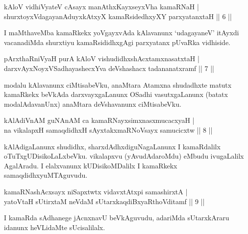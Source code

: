 
\begin{shl}
kAloV vidhiVyateV cAsayx manAthxKayxseyxVha kamaRNaH | \\
shurxtoyxVdagayanAduyxkAtxyX kamaRsidedhxyXY parxyatanxtaH \hfill|| 6 || 
\end{shl}

\begin{artha}
I maMthaveMba kamaRkekx yoVgayxvAda kAlavanunx `udagayaneV' itAyxdi vacanadiMda shurxtiyu kamaRsididhxgAgi parxyatanx pUvaRka vidhiside.
\end{artha}


\begin{shl}
pArxthaRniVyaH purA kAloV vishudidhxshAcx\s \s tamxnasatxtaH | \\
darxvAyxNoyxVSadhayashecxYva deVshashacx tadananatxramf \hfill|| 7 || 
\end{shl}

\begin{artha}
modalu kAlavanunx ciMtisabeVku, anaMtara Atamxna shudadhxte matutx kamaRkekx beVkAda darxvayxgaLanunx OSadhi vasutxgaLanunx (batatx modalAdavanUnx) anaMtara deVshavanunx ciMtisabeVku.
\end{artha}

\begin{shl}
kAlAdiVnAM guNAnAM ca kamaRNayxsimxnasxmucacxyaH | \\
na vikalapxH samaqdidhxH sAyxtakxmaRNoV\s sayx samucicxtw \hfill|| 8 || 
\end{shl}

\begin{artha}
kAlAdigaLanunx shudidhx, sharxdAdhxdiguNagaLanunx I kamaRdalilx oTuTxgUDisikoLaLxbeVku. vikalapxvu (yAvudAdaroMdu) eMbudu ivugaLalilx AgalAradu. I elalxvanunx kUDisikoMDalilx I kamaRkekx samaqdidhxyuMTAguvudu.
\end{artha}


\begin{shl}
kamaRNashAcxsayx niSapxtwtx vidavxtAtx\s pi samashirxtA | \\
yatoV\s taH sUtirxtaM neVdaM sUtarxkaqdiBxyaRthoVditamf \hfill|| 9 || 
\end{shl}

\begin{artha}
I kamaRda sAdhanege jAcnxnavU beVkAguvudu, adariMda sUtarxkAraru idanunx heVLidaMte sUcisalilalx.
\end{artha}

